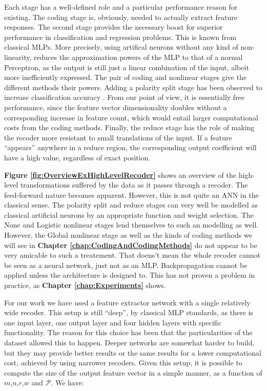 \documentclass[12pt,a4paper,oneside,english]{UPBThesis}
\begin{document}
Each stage has a well-defined role and a particular performance reason for existing. The coding stage is, obviously, needed to actually extract feature responses. The second stage provides the necessary boost for superior performance in classification and regression problems. This is known from classical MLPs. More precisely, using artifical neurons without any kind of non-linearity, reduces the approximation powers of the MLP to that of a normal Perceptron, as the output is still just a linear combination of the input, albeit more inefficiently expressed. The pair of coding and nonlinear stages give the different methods their powers. Adding a polarity split stage has been observed to increase classification accuracy \cite{importance-encoding-sparse-coding-vq}. From our point of view, it is essentially free performance, since the feature vector dimensionality doubles without a corresponding increase in feature count, which would entail larger computational costs from the coding methods. Finally, the reduce stage has the role of making the recoder more resistant to small translations of the input. If a feature ``appears'' anywhere in a reduce region, the corresponding output coefficient will have a high value, regardless of exact position.

\textbf{Figure \ref{fig:OverviewExHighLevelRecoder}} shows an overview of the high-level transformations suffered by the data as it passes through a recoder. The feed-forward nature becomes apparent. However, this is not quite an ANN in the classical sense. The polarity split and reduce stages can very well be modelled as classical artificial neurons by an appropriate function and weight selection. The None and Logistic nonlinear stages lend themselves to such an modelling as well. However, the Global nonlinear stage as well as the kinds of coding methods we will see in \textbf{Chapter \ref{chap:CodingAndCodingMethods}} do not appear to be very amicable to such a treatement. That doens't mean the whole recoder cannot be seen as a neural network, just not as an MLP. Backpropagation cannot be applied unless the architecture is designed to. This has not proven a problem in practice, as \textbf{Chapter \ref{chap:Experiments}} shows.

For our work we have used a feature extractor network with a single relatively wide recoder. This setup is still ``deep'', by classical MLP standards, as there is one input layer, one output layer and four hidden layers with specific functionality. The reason for this choice has been that the particularities of the dataset allowed this to happen. Deeper networks are somewhat harder to build, but they may provide better results or the same results for a lower computational cost, achieved by using narrower recoders. Given this setup, it is possible to compute the size of the output feature vector in a simple manner, as a function of $m$,$n$,$r$,$w$ and $\mathcal{P}$. We have:
\end{document}
